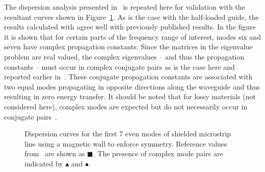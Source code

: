 The dispersion analysis presented in~\cite{PelCoc1998} is repeated
here for validation with the resultant curves shown in
Figure~\ref{lezar:fig:shielded_microstrip_dispersion_curves}. As is the case
with the half-loaded guide, the results calculated with \fenics{}
agree well with previously published results. In the figure it is
shown that for certain parts of the frequency range of interest, modes
six and seven have complex propagation constants. Since the matrices
in the eigenvalue problem are real valued, the complex eigenvalues --
and thus the propagation constants -- must occur in complex conjugate
pairs as is the case here and reported earlier
in~\cite{HuaIto1988}. These conjugate propagation constants are
associated with two equal modes propagating in opposite directions
along the waveguide and thus resulting in zero energy transfer. It
should be noted that for lossy materials (not considered here),
complex modes are expected but do not necessarily occur in conjugate
pairs~\cite{PelCoc1998}.
\begin{figure}[h]
 \centering
 \caption{Dispersion curves for the first 7 even modes of shielded microstrip line using a magnetic wall to enforce symmetry.  Reference values from~\cite{PelCoc1998} are shown as $\blacksquare$.  The presence of complex mode pairs are indicated by $\blacktriangle$ and $\bullet$.}
 \label{lezar:fig:shielded_microstrip_dispersion_curves}
\end{figure}
\label{lezar:sec:shielded_microstrip|)}
